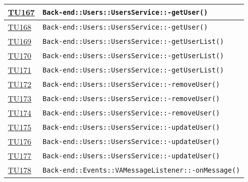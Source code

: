 \begin{longtable}{|>{\centering}m{1cm}|m{12cm}<{\centering}|}
\hyperlink{TU167}{TU167} & \texttt{Back-end::Users::UsersService::-\linebreak getUser()}\\ \hline

\hyperlink{TU168}{TU168} & \texttt{Back-end::Users::UsersService::-\linebreak getUser()}\\ \hline

\hyperlink{TU169}{TU169} & \texttt{Back-end::Users::UsersService::-\linebreak getUserList()}\\ \hline

\hyperlink{TU170}{TU170} & \texttt{Back-end::Users::UsersService::-\linebreak getUserList()}\\ \hline

\hyperlink{TU171}{TU171} & \texttt{Back-end::Users::UsersService::-\linebreak getUserList()}\\ \hline

\hyperlink{TU172}{TU172} & \texttt{Back-end::Users::UsersService::-\linebreak removeUser()}\\ \hline

\hyperlink{TU173}{TU173} & \texttt{Back-end::Users::UsersService::-\linebreak removeUser()}\\ \hline

\hyperlink{TU174}{TU174} & \texttt{Back-end::Users::UsersService::-\linebreak removeUser()}\\ \hline

\hyperlink{TU175}{TU175} & \texttt{Back-end::Users::UsersService::-\linebreak updateUser()}\\ \hline

\hyperlink{TU176}{TU176} & \texttt{Back-end::Users::UsersService::-\linebreak updateUser()}\\ \hline

\hyperlink{TU177}{TU177} & \texttt{Back-end::Users::UsersService::-\linebreak updateUser()}\\ \hline

\hyperlink{TU178}{TU178} & \texttt{Back-end::Events::VAMessageListener::-\linebreak onMessage()}\\ \hline


\end{longtable}
